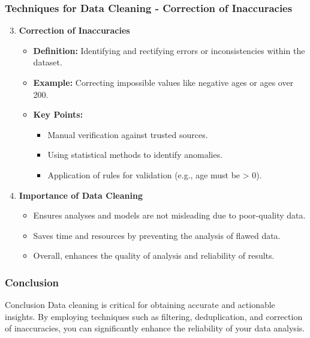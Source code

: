 \documentclass[aspectratio=169]{beamer}
\begin{document}
\begin{frame}[fragile]
    \frametitle{Techniques for Data Cleaning - Correction of Inaccuracies}
    \begin{enumerate}
        \setcounter{enumi}{2}
        \item \textbf{Correction of Inaccuracies}
        \begin{itemize}
            \item \textbf{Definition:} Identifying and rectifying errors or inconsistencies within the dataset.
            \item \textbf{Example:} Correcting impossible values like negative ages or ages over 200.
            \item \textbf{Key Points:}
            \begin{itemize}
                \item Manual verification against trusted sources.
                \item Using statistical methods to identify anomalies.
                \item Application of rules for validation (e.g., age must be > 0).
            \end{itemize}
        \end{itemize}
        
        \item \textbf{Importance of Data Cleaning}
        \begin{itemize}
            \item Ensures analyses and models are not misleading due to poor-quality data.
            \item Saves time and resources by preventing the analysis of flawed data.
            \item Overall, enhances the quality of analysis and reliability of results.
        \end{itemize}
    \end{enumerate}
\end{frame}

\begin{frame}[fragile]
    \frametitle{Conclusion}
    \begin{block}{Conclusion}
        Data cleaning is critical for obtaining accurate and actionable insights. By employing techniques such as filtering, deduplication, and correction of inaccuracies, you can significantly enhance the reliability of your data analysis.
    \end{block}
\end{frame}
\end{document}
